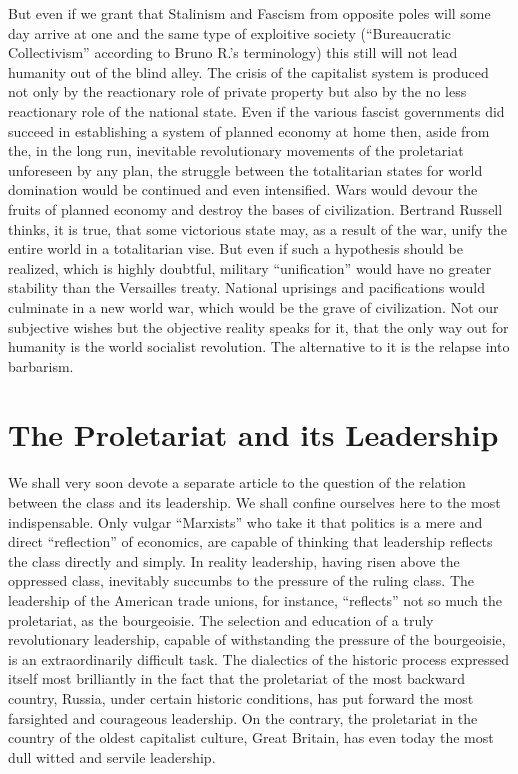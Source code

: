 But even if we grant that Stalinism and Fascism from opposite poles will some day arrive at one and the same type of exploitive society (“Bureaucratic Collectivism” according to Bruno R.’s terminology) this still will not lead humanity out of the blind alley. The crisis of the capitalist system is produced not only by the reactionary role of private property but also by the no less reactionary role of the national state. Even if the various fascist governments did succeed in establishing a system of planned economy at home then, aside from the, in the long run, inevitable revolutionary movements of the proletariat unforeseen by any plan, the struggle between the totalitarian states for world domination would be continued and even intensified. Wars would devour the fruits of planned economy and destroy the bases of civilization. Bertrand Russell thinks, it is true, that some victorious state may, as a result of the war, unify the entire world in a totalitarian vise. But even if such a hypothesis should be realized, which is highly doubtful, military “unification” would have no greater stability than the Versailles treaty. National uprisings and pacifications would culminate in a new world war, which would be the grave of civilization. Not our subjective wishes but the objective reality speaks for it, that the only way out for humanity is the world socialist revolution. The alternative to it is the relapse into barbarism.

\enlargethispage{\baselineskip}

\section*{The Proletariat and its Leadership}

We shall very soon devote a separate article to the question of the relation between the class and its leadership. We shall confine ourselves here to the most indispensable. Only vulgar “Marxists” who take it that politics is a mere and direct “reflection” of economics, are capable of thinking that leadership reflects the class directly and simply. In reality leadership, having risen above the oppressed class, inevitably succumbs to the pressure of the ruling class. The leadership of the American trade unions, for instance, “reflects” not so much the proletariat, as the bourgeoisie. The selection and education of a truly revolutionary leadership, capable of withstanding the pressure of the bourgeoisie, is an extraordinarily difficult task. The dialectics of the historic process expressed itself most brilliantly in the fact that the proletariat of the most backward country, Russia, under certain historic conditions, has put forward the most farsighted and courageous leadership. On the contrary, the proletariat in the country of the oldest capitalist culture, Great Britain, has even today the most dull witted and servile leadership.

